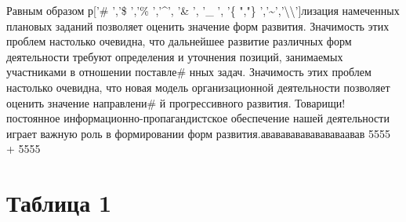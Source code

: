 \documentclass[a4paper,11pt]{article}
\begin{document}
Равным образом р['\# ','\$ ','\% ','\textasciicircum ', '\& ', '\_ ', '\{ ","\} ','\textasciitilde ','\textbackslash \textbackslash ']лизация намеченных плановых заданий позволяет оценить значение форм развития. Значимость этих проблем настолько очевидна, что дальнейшее развитие различных форм деятельности требуют определения и уточнения позиций, занимаемых участниками в отношении поставле\# нных задач. Значимость этих проблем настолько очевидна, что новая модель организационной деятельности позволяет оценить значение направлени\# й прогрессивного развития. Товарищи! постоянное информационно-пропагандистское обеспечение нашей деятельности играет важную роль в формировании форм развития.ававававававававаавав  5555 +
5555
\section{Таблица 1}
\small
\end{document}

